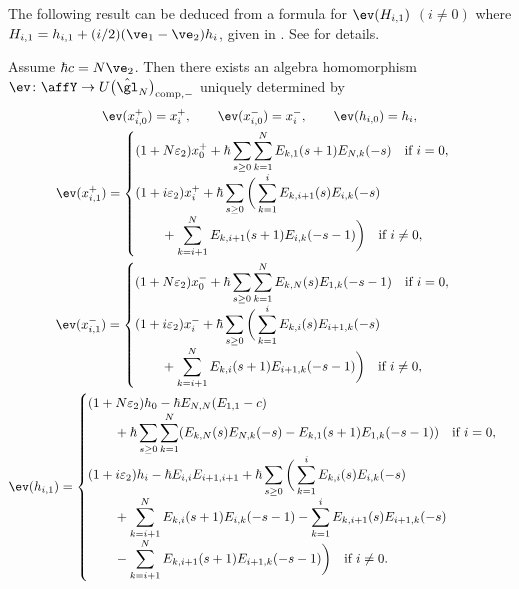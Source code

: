 The following result can be deduced from a formula for $\ev(H_{i,1})$ $(i \neq 0)$ where $H_{i,1}=h_{i,1} + (i/2)(\ve_1-\ve_2)h_i$, given in \cite[Section~6, pp.~462--463]{MR2323534}. See \cite{kodera_evaluation} for details.
\begin{thm}Assume $\hbar c = N \ve_2$. Then there exists an algebra homomorphism $\ev \colon \affY \to U\big(\hat{\gl}_N\big)_{{\rm comp},-}$ uniquely determined by
\begin{gather*}
\ev(x_{i,0}^{+}) = x_{i}^{+}, \qquad \ev(x_{i,0}^{-}) = x_{i}^{-},\qquad \ev(h_{i,0}) = h_{i},\\
\ev(x_{i,1}^{+}) = \begin{cases}
(1+ N \varepsilon_2) x_{0}^{+} + \hbar \displaystyle\sum_{s \geq 0} \sum_{k=1}^N E_{k,1}(s+1) E_{N,k}(-s) \quad \text{if $i = 0$},\\
(1+ i \varepsilon_2) x_{i}^{+} + \hbar \displaystyle\sum_{s \geq 0} \bigg( \sum_{k=1}^i E_{k,i+1}(s) E_{i,k}(-s)\\
\qquad{} + \displaystyle \sum_{k=i+1}^N E_{k,i+1}(s+1) E_{i,k}(-s-1) \bigg) \quad \text{if $i \neq 0$},
\end{cases}\\
\ev(x_{i,1}^-) = \begin{cases}
(1+ N \varepsilon_2) x_{0}^{-} + \hbar \displaystyle\sum_{s \geq 0} \sum_{k=1}^N E_{k,N}(s) E_{1,k}(-s-1)\quad \text{if $i = 0$},\\
(1+ i \varepsilon_2) x_{i}^{-} + \hbar \displaystyle\sum_{s \geq 0} \bigg( \sum_{k=1}^i E_{k,i}(s) E_{i+1,k}(-s) \\
\qquad {} + \displaystyle\sum_{k=i+1}^N E_{k,i}(s+1) E_{i+1,k}(-s-1) \bigg) \quad \text{if $i \neq 0$},
\end{cases}\\
\ev(h_{i,1}) = \begin{cases}
(1+ N \varepsilon_2) h_{0} - \hbar E_{N,N} (E_{1,1}-c) \\
\qquad {}+ \hbar \displaystyle\sum_{s \geq 0} \sum_{k=1}^{N} ( E_{k,N}(s) E_{N,k}(-s) - E_{k,1}(s+1) E_{1,k}(-s-1) ) \quad \text{if $i = 0$},\\
(1+ i \varepsilon_2) h_{i} - \hbar E_{i,i}E_{i+1,i+1}+ \hbar \displaystyle\sum_{s \geq 0} \bigg( \sum_{k=1}^{i} E_{k,i}(s) E_{i,k}(-s) \\
\qquad{}+ \displaystyle\sum_{k=i+1}^{N} E_{k,i}(s+1) E_{i,k}(-s-1) - \displaystyle\sum_{k=1}^{i}E_{k,i+1}(s) E_{i+1,k}(-s) \\
\qquad {} - \displaystyle\sum_{k=i+1}^{N} E_{k,i+1}(s+1) E_{i+1,k}(-s-1) \bigg)\quad \text{if $i \neq 0$}.
\end{cases}
\end{gather*}
\end{thm}
